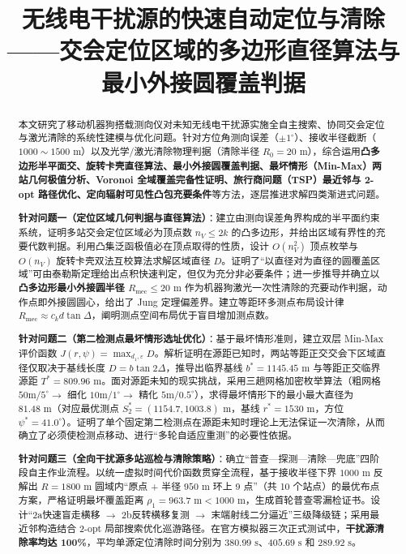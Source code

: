 \documentclass[12pt,a4paper,UTF8]{ctexart}
\title{\textbf{\zihao{3} 无线电干扰源的快速自动定位与清除}\\[2mm]
\zihao{4} ——交会定位区域的多边形直径算法与最小外接圆覆盖判据}
\author{}
\date{}
\begin{document}
\maketitle
\thispagestyle{empty}

\begin{abstract}
本文研究了移动机器狗搭载测向仪对未知无线电干扰源实施全自主搜索、协同交会定位与激光清除的系统性建模与优化问题。针对方位角测向误差（$\pm 1^\circ$）、接收半径截断（$1000\sim 1500\text{ m}$）以及光学/激光清除物理判据（清除半径 $R_0 = 20\text{ m}$），综合运用\textbf{凸多边形半平面交、旋转卡壳直径算法、最小外接圆覆盖判据、最坏情形（Min-Max）两站几何极值分析、Voronoi 全域覆盖完备性证明、旅行商问题（TSP）最近邻与 2-opt 路径优化、定向辐射可见性凸包充要条件}等方法，逐层推进求解四类渐进式问题。

\textbf{针对问题一（定位区域几何判据与直径算法）}：建立由测向误差角界构成的半平面约束系统，证明多站交会定位区域必为顶点数 $n_V \le 2k$ 的凸多边形，并给出区域有界性的充要代数判据。利用凸集泛函极值必在顶点取得的性质，设计 $O(n_V^2)$ 顶点枚举与 $O(n_V)$ 旋转卡壳双法互校算法求解区域直径 $D$。证明了“以直径对为直径的圆覆盖区域”可由泰勒斯定理给出点积快速判定，但仅为充分非必要条件；进一步推导并确立以\textbf{凸多边形最小外接圆半径 $R_{\text{mec}} \le 20\text{ m}$} 作为机器狗激光一次性清除的充要动作判据，动作点即外接圆圆心，给出了 Jung 定理偏差界。建立等距环多测点布局设计律 $R_{\text{mec}} \approx c_k d \tan\Delta$，阐明测点空间布局优于盲目增加测点数。

\textbf{针对问题二（第二检测点最坏情形选址优化）}：基于最坏情形准则，建立双层 Min-Max 评价函数 $J(r, \psi) = \max_{d_1, \varepsilon} D$。解析证明在源距已知时，两站等距正交交会下区域直径仅取决于基线长度 $D = b\tan 2\Delta$，推导出临界基线 $b^* = 1145.45\text{ m}$ 与等距正交临界源距 $T^* = 809.96\text{ m}$。面对源距未知的现实挑战，采用三趟网格加密枚举算法（粗网格 $50\text{m}/5^\circ \to$ 细化 $10\text{m}/1^\circ \to$ 精化 $5\text{m}/0.5^\circ$），求得最坏情形下的最小最大直径为 $81.48\text{ m}$（对应最优测点 $S_2^* = (1154.7, 1003.8)\text{ m}$，基线 $r^* = 1530\text{ m}$，方位 $\psi^* = 41.0^\circ$）。证明了单个固定第二检测点在源距未知时理论上无法保证一次清除，从而确立了必须使检测点移动、进行“多轮自适应重测”的必要性依据。

\textbf{针对问题三（全向干扰源多站巡检与清除策略）}：确立“普查—探测—清除—兜底”四阶段自主作业流程。以统一虚拟时间代价函数贯穿全流程，基于接收半径下界 $1000\text{ m}$ 反解出 $R=1800\text{ m}$ 圆域内“原点 + 半径 $950\text{ m}$ 环上 9 点”（共 10 个站点）的最优布点方案，严格证明最坏覆盖距离 $\rho_1 = 963.7\text{ m} < 1000\text{ m}$，生成首轮普查零漏检证书。设计“2a快速盲走横移 $\to$ 2b反转横移复测 $\to$ 末端射线二分逼近”三级降级链；采用最近邻构造结合 2-opt 局部搜索优化巡游路径。在官方模拟器三次正式测试中，\textbf{干扰源清除率均达 100\%}，平均单源定位清除时间分别为 $380.99\text{ s}$、$405.69\text{ s}$ 和 $289.92\text{ s}$。


\end{abstract}
\end{document}
